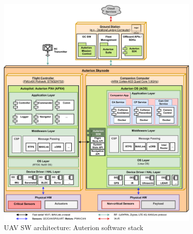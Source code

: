 \begin{figure}[!hbt]
  \centering
  \includegraphics[width=0.9\textwidth]{./img/pdf/uav-main-sw-arch-auterion.pdf} 
%   
  \caption{UAV SW architecture: Auterion software stack}%
  \label{fig:uav-sw-arch-auterion}
\end{figure}

